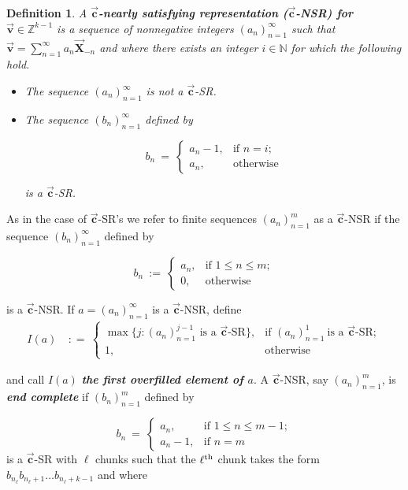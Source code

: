 \documentclass[]{interact}
\newcommand{\N}{{\mathbb N}}  %
\newcommand{\vtr}[1]{\vec{\mathbf{#1}}}
\theoremstyle{plain}
\numberwithin{equation}{section} %
\newtheorem{definition}[thm]{Definition}
\numberwithin{table}{section} %
\numberwithin{figure}{section}
\newcommand{\X}{\vtr{X}}
\begin{document}
\begin{definition}
\label{defintion:NSR}
    A \textbf{$\vtr{c}$-nearly satisfying representation ($\vtr{c}$-NSR) for $\vtr{v} \in \mathbb{Z}^{k-1}$} is a sequence of nonnegative integers $(a_n)_{n=1}^\infty$ such that $\vtr{v}=\sum_{n=1}^\infty a_n \X_{-n}$ and where there exists an integer $i\in \N $ for which the following hold. 
        \begin{itemize}
            \item The sequence $(a_n)_{n=1}^\infty$ is not a $\vtr{c}$-SR.
            \item The sequence $(b_n)_{n=1}^\infty$ defined by
            
            $$b_n\ =\ \begin{cases}
                a_n-1, & \text{if }n=i; \\
                a_n, & \text{otherwise}
            \end{cases}$$

            \noindent is a $\vtr{c}$-SR.
        \end{itemize}
        
\end{definition}

As in the case of $\vtr{c}$-SR's we refer to finite sequences $(a_n)_{n=1}^m$ as a $\vtr{c}$-NSR if the sequence $(b_n)_{n=1}^\infty$ defined by

    \[b_n\ :=\ \begin{cases}
        a_n ,& \text{if }1\leq n\leq m; \\
        0, & \text{otherwise}
    \end{cases}\]

    \noindent is a $\vtr{c}$-NSR. If $a=(a_n)_{n=1}^\infty$ is a $\vtr{c}$-NSR, define
    \begin{align*}
    I(a)\ &: =\ \begin{cases}
        \max\{j :(a_n)_{n=1}^{j-1}\text{ is a $\vtr{c}$-SR} \}, & \text{if } (a_n)_{n=1}^1\ \text{is a }\vtr{c}\text{-SR};\\
        1, & \text{otherwise}
    \end{cases}
    \end{align*}
   
    \noindent and call $I(a)$ \textbf{\textit{the first overfilled element of $a$}}. A $\vtr{c}$-NSR, say $(a_n)_{n=1}^m$, is \textit{\textbf{end complete}} if $(b_n)_{n=1}^m$ defined by 

     \[b_n\ =\ \begin{cases}
        a_n, & \text{if }1\leq n\leq m-1; \\
        a_n-1, & \text{if }n=m
    \end{cases}\]
 is a $\vtr{c}$-SR with $\ell$ chunks such that the $\ell^{\rm th}$ chunk takes the form $b_{n_\ell}b_{n_{\ell}+1}\dots b_{n_\ell+k-1}$ and where
\end{document}
